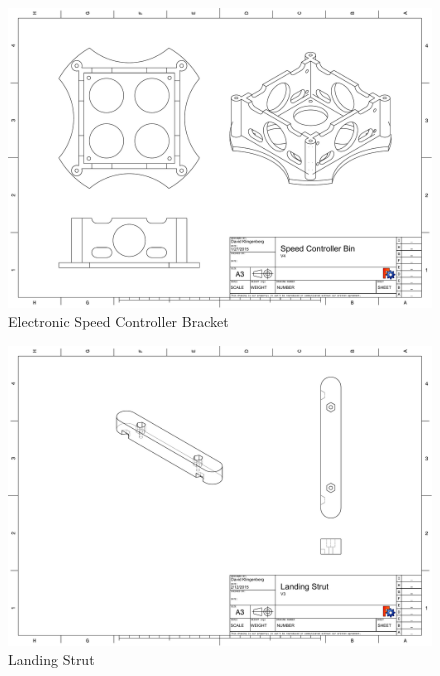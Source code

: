 \documentclass[pdftex,11pt]{article}
\begin{document}
\begin{figure}[!h]
	\centering
		\includegraphics[width=1\textwidth]{./graphics/Speed_controler_bin-eps-converted-to.pdf}
	\caption{Electronic Speed Controller Bracket}
	\label{fig:partbin}
\end{figure}

\begin{figure}[!h]
	\centering
		\includegraphics[width=1\textwidth]{./graphics/Landing_strut-eps-converted-to.pdf}
	\caption{Landing Strut}
	\label{fig:landingStrut}
\end{figure}
\end{document}
